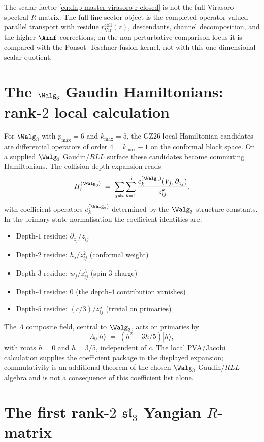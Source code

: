 The scalar factor
\eqref{eq:dnp-master-virasoro-r-closed} is not the full Virasoro
spectral $R$-matrix.  The full line-sector object is the completed
operator-valued parallel transport with residue
$r_{\mathrm{Vir}}^{\mathrm{coll}}(z)$, descendants, channel
decomposition, and the higher $\Ainf$ corrections; on the
non-perturbative comparison locus it is compared with the
Ponsot--Teschner fusion kernel, not with this one-dimensional scalar
quotient.

\section{The $\Walg_3$ Gaudin Hamiltonians: rank-$2$ local calculation}
\label{sec:dnp-master-w3-hamiltonians}

For $\Walg_3$ with $p_{\max} = 6$ and $k_{\max} = 5$, the GZ26
local Hamiltonian candidates are differential operators of order
$4 = k_{\max} - 1$ on the conformal block space.  On a supplied
$\Walg_3$ Gaudin/$RLL$ surface these candidates become commuting
Hamiltonians.  The collision-depth expansion reads
\[
H_i^{(\Walg_3)}
\;=\;
\sum_{j\neq i}
\sum_{k=1}^{5}
\frac{c_k^{(\Walg_3)}(V_j,\partial_{z_j})}{z_{ij}^k},
\]
with coefficient operators $c_k^{(\Walg_3)}$ determined by the
$\Walg_3$ structure constants. In the primary-state normalisation
the coefficient identities are:
\begin{itemize}
\item Depth-$1$ residue: $\partial_{z_j}/z_{ij}$
\item Depth-$2$ residue: $h_j/z_{ij}^2$ (conformal weight)
\item Depth-$3$ residue: $w_j/z_{ij}^3$ (spin-$3$ charge)
\item Depth-$4$ residue: $0$ (the depth-$4$ contribution vanishes)
\item Depth-$5$ residue: $(c/3)/z_{ij}^5$ (trivial on primaries)
\end{itemize}

The $\Lambda$ composite field, central to $\Walg_3$, acts on
primaries by
\[
\Lambda_0|h\rangle
\;=\;
(h^2 - 3h/5)|h\rangle,
\]
with roots $h = 0$ and $h = 3/5$, independent of $c$.
The local PVA/Jacobi calculation supplies the coefficient package in
the displayed expansion; commutativity is an additional theorem of the
chosen $\Walg_3$ Gaudin/$RLL$ algebra and is not a consequence of this
coefficient list alone.

\section{The first rank-$2$ $\mathfrak{sl}_3$ Yangian $R$-matrix}
\label{sec:dnp-master-sl3-yangian}

